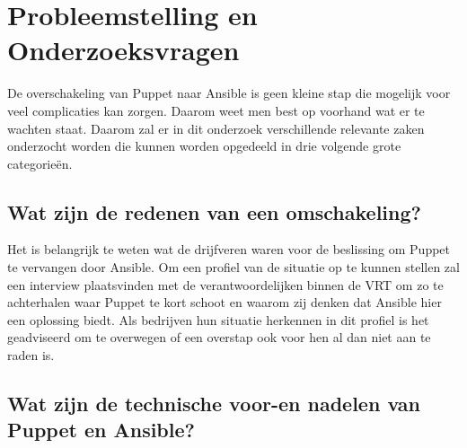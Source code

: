 \section{Probleemstelling en Onderzoeksvragen}
\label{sec:onderzoeksvragen}




De overschakeling van Puppet naar Ansible is geen kleine stap die mogelijk voor veel complicaties kan zorgen. Daarom weet men best op voorhand wat er te wachten staat. Daarom zal er in dit onderzoek verschillende relevante zaken onderzocht worden die kunnen worden opgedeeld in drie volgende grote categorie\"en. 


\subsection{Wat zijn de redenen van een omschakeling?}

Het is belangrijk te weten wat de drijfveren waren voor de beslissing om Puppet te vervangen door Ansible. Om een profiel van de situatie op te kunnen stellen zal een interview plaatsvinden met de verantwoordelijken binnen de VRT om zo te achterhalen waar Puppet te kort schoot en waarom zij denken dat Ansible hier een oplossing biedt. Als bedrijven hun situatie herkennen in dit profiel is het geadviseerd om te overwegen of een overstap ook voor hen al dan niet aan te raden is.

\subsection{Wat zijn de technische voor-en nadelen van Puppet en Ansible?}

